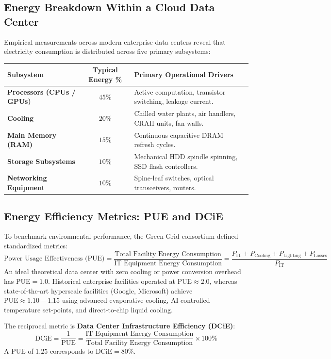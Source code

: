 \documentclass[11pt,a4paper,openany]{report}
\begin{document}
\subsection{Energy Breakdown Within a Cloud Data Center}
Empirical measurements across modern enterprise data centers reveal that electricity consumption is distributed across five primary subsystems:
\begin{center}
\begin{tabularx}{\textwidth}{>{\bfseries}l c X}
\toprule
Subsystem & Typical Energy \% & Primary Operational Drivers\\
\midrule
Processors (CPUs / GPUs) & $45\%$ & Active computation, transistor switching, leakage current.\\
Cooling & $20\%$ & Chilled water plants, air handlers, CRAH units, fan walls.\\
Main Memory (RAM) & $15\%$ & Continuous capacitive DRAM refresh cycles.\\
Storage Subsystems & $10\%$ & Mechanical HDD spindle spinning, SSD flash controllers.\\
Networking Equipment & $10\%$ & Spine-leaf switches, optical transceivers, routers.\\
\bottomrule
\end{tabularx}
\end{center}

\subsection{Energy Efficiency Metrics: PUE and DCiE}
To benchmark environmental performance, the Green Grid consortium defined standardized metrics:
\begin{equation}
\text{Power Usage Effectiveness (PUE)} = \frac{\text{Total Facility Energy Consumption}}{\text{IT Equipment Energy Consumption}} = \frac{P_{\text{IT}} + P_{\text{Cooling}} + P_{\text{Lighting}} + P_{\text{Losses}}}{P_{\text{IT}}}
\end{equation}
An ideal theoretical data center with zero cooling or power conversion overhead has $\text{PUE} = 1.0$. Historical enterprise facilities operated at $\text{PUE} \approx 2.0$, whereas state-of-the-art hyperscale facilities (Google, Microsoft) achieve $\text{PUE} \approx 1.10 - 1.15$ using advanced evaporative cooling, AI-controlled temperature set-points, and direct-to-chip liquid cooling.

The reciprocal metric is \textbf{Data Center Infrastructure Efficiency (DCiE)}:
\begin{equation}
\text{DCiE} = \frac{1}{\text{PUE}} = \frac{\text{IT Equipment Energy Consumption}}{\text{Total Facility Energy Consumption}} \times 100\%
\end{equation}
A $\text{PUE}$ of $1.25$ corresponds to $\text{DCiE} = 80\%$.
\end{document}
